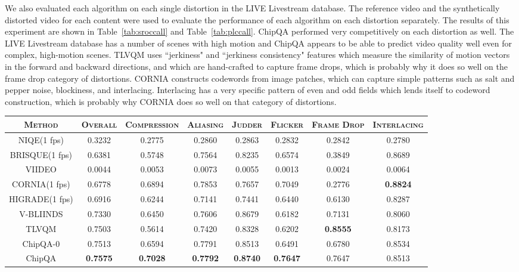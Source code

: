\documentclass[journal]{IEEEtran}
\begin{document}
We also evaluated each algorithm on each single distortion in the LIVE Livestream database. The reference video and the synthetically distorted video for each content were used to evaluate the performance of each algorithm on each distortion separately. The results of this experiment are shown in Table~\ref{tab:sroccall} and Table~\ref{tab:plccall}. ChipQA performed very competitively on each distortion as well. The LIVE Livestream database has a number of scenes with high motion and ChipQA appears to be able to predict video quality well even for complex, high-motion scenes. TLVQM uses ``jerkiness" and ``jerkiness consistency" features which measure the similarity of motion vectors in the forward and backward directions, and which are  hand-crafted to capture frame drops, which is probably why it does so well on the frame drop category of distortions. CORNIA constructs codewords from image patches, which can capture simple patterns such as salt and pepper noise, blockiness, and interlacing. Interlacing has a very specific pattern of even and odd fields which lends itself to codeword construction, which is probably why CORNIA does so well on that category of distortions.




\begin{table*}[!h]
\renewcommand\arraystretch{1.3}
\centering
\caption{SROCC of the Compared NR VQA Models on different subsets of the LIVE Livestream database. The Scores of the Top Performing Algorithm in each category are Boldfaced}\label{tab:sroccall}
\begin{tabular}{|c|c|c|c|c|c|c|c|}
\hline
\textsc{Method} & \textsc{Overall} & \textsc{Compression} & \textsc{Aliasing} & \textsc{Judder} & \textsc{Flicker} & \textsc{Frame Drop} & \textsc{Interlacing}\\

\hline
NIQE(1 fps)& 0.3232 &0.2775  & 0.2860  & 0.2863  & 0.2832  &0.2842  & 0.2780 \\
\hline
BRISQUE(1 fps)&0.6381& 0.5748  & 0.7564   & 0.8235  & 0.6574   & 0.3849  &  0.8689 \\
\hline
VIIDEO & 0.0044 & 0.0053  & 0.0073  & 0.0055  & 0.0013  & 0.0024  & 0.0064  \\
\hline
CORNIA(1 fps)&0.6778 & 0.6894  & 0.7853  &0.7657   & 0.7049  & 0.2776  & \textbf{0.8824}  \\
\hline
HIGRADE(1 fps)& 0.6916 & 0.6244  & 0.7141  & 0.7441  & 0.6440  & 0.6130  & 0.8287  \\
\hline
V-BLIINDS& 0.7330 & 0.6450  &0.7606  & 0.8679  & 0.6182  & 0.7131  & 0.8060  \\
\hline
TLVQM & 0.7503 & 0.5614  & 0.7420  & 0.8328  & 0.6202  & \textbf{0.8555} &  0.8173  \\
\hline
ChipQA-0 & 0.7513 & 0.6594  & 0.7791 & 0.8513  & 0.6491  & 0.6780 &  0.8534  \\
\hline
ChipQA & \textbf{0.7575} & \textbf{0.7028}  & \textbf{0.7792}  & \textbf{0.8740}  & \textbf{0.7647}  & 0.7647 &  0.8513  \\
\hline
\end{tabular}
\end{table*}
\end{document}
